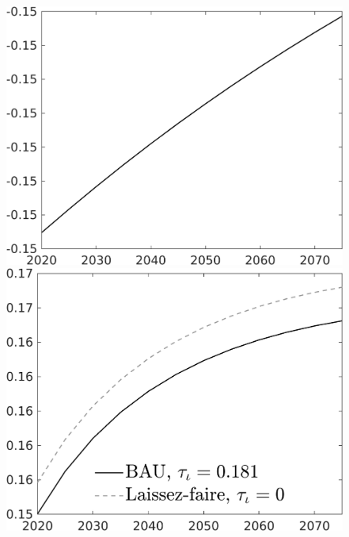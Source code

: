 \documentclass[12pt]{article}
\begin{document}
\begin{figure}[h!!]
\begin{minipage}[]{0.32\textwidth}
	\end{minipage}		
	\begin{minipage}[]{0.32\textwidth}
		\includegraphics[width=1\textwidth]{../../codding_model/own_basedOnFried/optimalPol_010922_revision/figures/all_13Sept22/CompTaul_LFBAUPer_Reg0_GFF_spillover0_nsk0_xgr1_knspil0_sep1_countec0_GovRev0_etaa0.79.png}
	\end{minipage}	
	\begin{minipage}[]{0.32\textwidth}
		\includegraphics[width=1\textwidth]{../../codding_model/own_basedOnFried/optimalPol_010922_revision/figures/all_13Sept22/CompTaul_LFBAU_Reg0_LgLf_spillover0_nsk0_xgr1_knspil0_sep1_countec0_GovRev0_etaa0.79_lgd1.png}

\end{minipage}
\end{figure}
\end{document}
